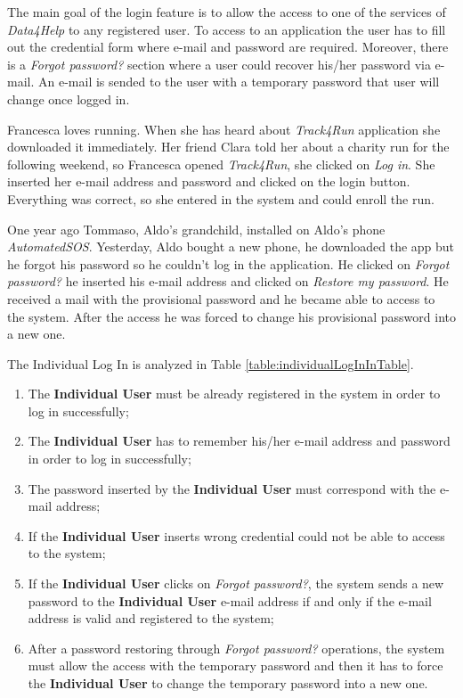 The main goal of the login feature is to allow the access to one of the services of \textit{Data4Help} to any registered user. To access to an application the user has to fill out the credential form where e-mail and password are required. Moreover, there is a \textit{Forgot password?} section where a user could recover his/her password via e-mail. An e-mail is sended to the user with a temporary password that user will change once logged in.

Francesca loves running. When she has heard about \textit{Track4Run} application she downloaded it immediately. Her friend Clara told her about a charity run for the following weekend, so Francesca opened \textit{Track4Run}, she clicked on \textit{Log in}. She inserted her e-mail address and password and clicked on the login button. Everything was correct, so she entered in the system and could enroll the run.

One year ago Tommaso, Aldo's grandchild, installed on Aldo’s phone \textit{AutomatedSOS}. Yesterday, Aldo bought a new phone, he downloaded the app but he forgot his password so he couldn’t log in the application. He clicked on \textit{Forgot password?} he inserted his e-mail address and clicked on \textit{Restore my password}. He received a mail with the provisional password and he became able to access to the system. After the access he was forced to change his provisional password into a new one.

The Individual Log In is analyzed in Table \ref{table:individualLogInInTable}.

\begin{enumerate}
  \item The \textbf{Individual User} must be already registered in the system in order to log in successfully;
  \item The \textbf{Individual User} has to remember his/her e-mail address and password in order to log in successfully;
  \item The password inserted by the \textbf{Individual User} must correspond with the e-mail address;
  \item If the \textbf{Individual User} inserts wrong credential could not be able to access to the system;
  \item If the \textbf{Individual User} clicks on \textit{Forgot password?}, the system sends a new password to the \textbf{Individual User} e-mail address if and only if the e-mail address is valid and registered to the system;
  \item After a password restoring through \textit{Forgot password?} operations, the system must allow the access with the temporary password and then it has to force the \textbf{Individual User} to change the temporary password into a new one.
\end{enumerate}

